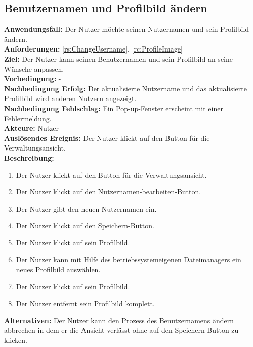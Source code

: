 \documentclass[parskip=full]{scrartcl}
\begin{document}
\subsection{Benutzernamen und Profilbild ändern}
\textbf{Anwendungsfall:} Der Nutzer möchte seinen Nutzernamen und sein Profilbild ändern.\\
\textbf{Anforderungen:} \ref{rs:ChangeUsername}, \ref{rc:ProfileImage}\\
\textbf{Ziel:} Der Nutzer kann seinen Benutzernamen und sein Profilbild an seine Wünsche anpassen.\\
\textbf{Vorbedingung:} -\\
\textbf{Nachbedingung Erfolg:} Der aktualisierte Nutzername und das aktualisierte Profilbild wird anderen Nutzern angezeigt.\\
\textbf{Nachbedingung Fehlschlag:} Ein Pop-up-Fenster erscheint mit einer Fehlermeldung.\\
\textbf{Akteure:} Nutzer\\
\textbf{Auslösendes Ereignis:} Der Nutzer klickt auf den Button für die Verwaltungsansicht.\\
\textbf{Beschreibung:}
\begin{enumerate}
    \item Der Nutzer klickt auf den Button für die Verwaltungsansicht.
    \item Der Nutzer klickt auf den Nutzernamen-bearbeiten-Button.
    \item Der Nutzer gibt den neuen Nutzernamen ein.
    \item Der Nutzer klickt auf den Speichern-Button.
    \item Der Nutzer klickt auf sein Profilbild.
    \item Der Nutzer kann mit Hilfe des betriebssystemeigenen Dateimanagers ein neues Profilbild auswählen.
    \item Der Nutzer klickt auf sein Profilbild.
    \item Der Nutzer entfernt sein Profilbild komplett.
\end{enumerate}
\textbf{Alternativen:} Der Nutzer kann den Prozess des Benutzernamens ändern abbrechen in dem er die Ansicht verlässt ohne auf den Speichern-Button zu klicken.
\newpage
\end{document}
